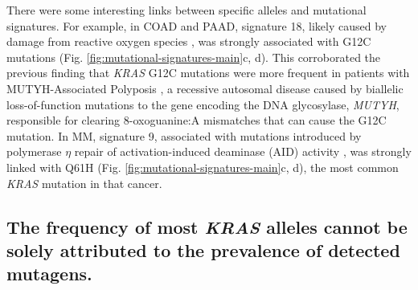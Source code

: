 \documentclass[english, 10pt, letterpaper]{article}
\newcommand{\KRAS}{\emph{KRAS}}
\begin{document}
There were some interesting links between specific alleles and mutational signatures.
For example, in COAD and PAAD, signature 18, likely caused by damage from reactive oxygen species \cite{Viel2017, Pilati2017}, was strongly associated with G12C mutations (Fig. \ref{fig:mutational-signatures-main}c, d).
This corroborated the previous finding that \KRAS{} G12C mutations were more frequent in patients with MUTYH-Associated Polyposis \cite{Viel2017}, a recessive autosomal disease caused by biallelic loss-of-function mutations to the gene encoding the DNA glycosylase, \emph{MUTYH}, responsible for clearing 8-oxoguanine:A mismatches that can cause the G12C mutation.
In MM, signature 9, associated with mutations introduced by polymerase $\eta$ repair of activation-induced deaminase (AID) activity \cite{Alexandrov2013, Rogozin2018DNACancer., Petljak2016UnderstandingCancer.}, was strongly linked with Q61H (Fig. \ref{fig:mutational-signatures-main}c, d), the most common \KRAS{} mutation in that cancer.


\subsection*{The frequency of most \KRAS{} alleles cannot be solely attributed to the prevalence of detected mutagens.}
\end{document}
